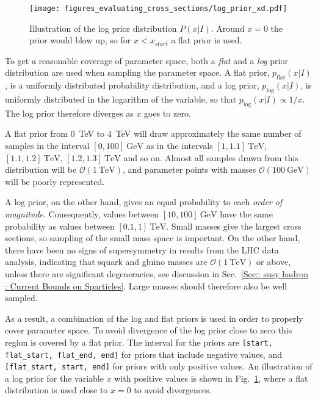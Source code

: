 \documentclass[twoside,english]{uiofysmaster}
\begin{document}
{{\begin{figure}
\centering
\texttt{[image: figures\_evaluating\_cross\_sections/log\_prior\_xd.pdf]}
\caption{Illustration of the log prior distribution $P(x|I)$. Around $x=0$ the prior would blow up, so for $x < x_{start}$ a flat prior is used.}
\label{Fig:: evaluating cross : prior illustration}
\end{figure}

To get a reasonable coverage of parameter space, both a \textit{flat} and a \textit{log} prior distribution are used when sampling the parameter space. A flat prior, $p_{\mathrm{flat}}(x | I)$, is a uniformly distributed probability distribution, and a log prior, $p_{\mathrm{log}}(x |I)$, is uniformly distributed in the logarithm of the variable, so that $p_{\mathrm{log}}(x |I) \propto 1/x$. The log prior therefore diverges as $x$ goes to zero. 

A flat prior from 0~TeV to 4~TeV will draw approximately the same number of samples in the interval $[0, 100]~\mathrm{GeV}$ as in the intervals $[1,1.1]~\mathrm{TeV}$, $[1.1,1.2]~\mathrm{TeV}$,  $[1.2,1.3]~\mathrm{TeV}$ and so on. Almost all samples drawn from this distribution will be $\mathcal{O}(1~\mathrm{TeV})$, and parameter points with masses $\mathcal{O}( 100~\mathrm{GeV})$ will be poorly represented.

A log prior, on the other hand, gives an equal probability to each \textit{order of magnitude}. Consequently, values between $[10,100]~\mathrm{GeV}$ have the same probability as values between $[0.1,1]~\mathrm{TeV}$. Small masses give the largest cross sections, so sampling of the small mass space is important. On the other hand, there have been no signs of supersymmetry in results from the LHC data analysis, indicating that squark and gluino masses are $\mathcal{O}(1~\mathrm{TeV})$ or above, unless there are significant degeneracies, see discussion in Sec.~\ref{Sec:: susy hadron : Current Bounds on Sparticles}. Large masses should therefore also be well sampled. 

As a result, a combination of the log and flat priors is used in order to properly cover parameter space. To avoid divergence of the log prior close to zero this region is covered by a flat prior. The interval for the priors are \verb|[start, flat_start, flat_end, end]| for priors that include negative values, and \verb|[flat_start, start, end]| for priors with only positive values. An illustration of a log prior for the variable $x$ with positive values is shown in Fig.~\ref{Fig:: evaluating cross : prior illustration}, where a flat distribution is used close to $x=0$ to avoid divergences.





}}
\end{document}
